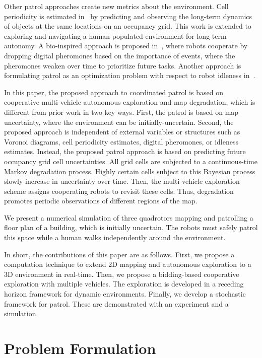 \documentclass[smallextended]{svjour3}       %
\begin{document}
Other patrol approaches create new metrics about the environment. Cell periodicity is estimated in~\cite{KraFenCieDonDuc14,KraFenHanDuc16} by predicting and observing the long-term dynamics of objects at the same locations on an occupancy grid. This work is extended to exploring and navigating a human-populated environment for long-term autonomy. A bio-inspired approach is proposed in~\cite{ZhaXia11}, where robots cooperate by dropping digital pheromones based on the importance of events, where the pheromones weaken over time to prioritize future tasks. Another approach is formulating patrol as an optimization problem with respect to robot idleness in~\cite{YanZha16}.

In this paper, the proposed approach to coordinated patrol is based on cooperative multi-vehicle autonomous exploration and map degradation, which is different from prior work in two key ways. First, the patrol is based on map uncertainty, where the environment can be initially-uncertain. Second, the proposed approach is independent of external variables or structures such as Voronoi diagrams, cell periodicity estimates, digital pheromones, or idleness estimates. Instead, the proposed patrol approach is based on predicting future occupancy grid cell uncertainties. All grid cells are subjected to a continuous-time Markov degradation process. Highly certain cells subject to this Bayesian process slowly increase in uncertainty over time. Then, the multi-vehicle exploration scheme assigns cooperating robots to revisit these cells. Thus, degradation promotes periodic observations of different regions of the map.

We present a numerical simulation of three quadrotors mapping and patrolling a floor plan of a building, which is initially uncertain. The robots must safely patrol this space while a human walks independently around the environment.

In short, the contributions of this paper are as follows. First, we propose a computation technique to extend 2D mapping and autonomous exploration to a 3D environment in real-time. Then, we propose a bidding-based cooperative exploration with multiple vehicles. The exploration is developed in a receding horizon framework for dynamic environments. Finally, we develop a stochastic framework for patrol. These are demonstrated with an experiment and a simulation.


\section{Problem Formulation}
\label{sec:ProbDef}
\end{document}
